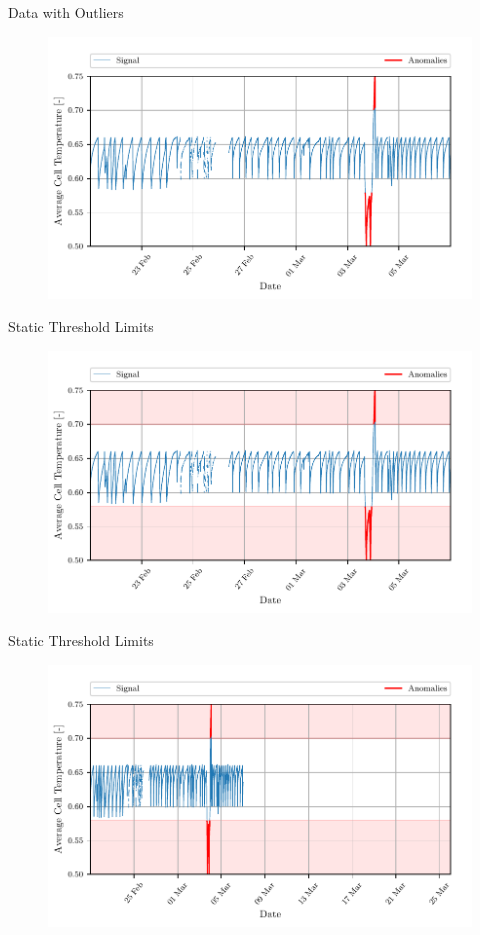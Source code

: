 \documentclass[aspectratio=169]{beamer}
\begin{document}
\begin{frame}{Data with Outliers}
    \begin{figure}[htpb]
        \begin{center}
            \includegraphics[width=0.75\linewidth]{../ilustrate/pc2023/bess/naive/min_anomalies.pdf}
        \end{center}
    \end{figure}
\end{frame}

\begin{frame}{Static Threshold Limits}
    \begin{figure}[htpb]
        \begin{center}
            \includegraphics[width=0.75\linewidth]{../ilustrate/pc2023/bess/naive/min_thresh.pdf}
        \end{center}
    \end{figure}
\end{frame}

\begin{frame}{Static Threshold Limits}
    \begin{figure}[htpb]
        \begin{center}
            \includegraphics[width=0.75\linewidth]{../ilustrate/pc2023/bess/naive/pred_thresh.pdf}
        \end{center}
    \end{figure}
\end{frame}
\end{document}
